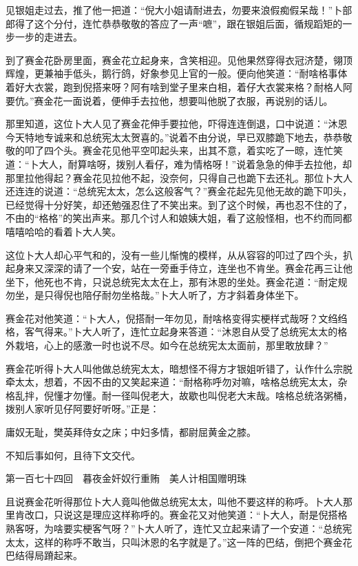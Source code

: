 \documentclass[12pt,UTF8]{ctexbook}
\begin{document}
{{{见银姐走过去，推了他一把道：“倪大小姐请耐进去，勿要来浪假痴假呆哉！”卜部郎得了这个分付，连忙恭恭敬敬的答应了一声“嗻”，跟在银姐后面，循规蹈矩的一步一步的走进去。

到了赛金花卧房里面，赛金花立起身来，含笑相迎。见他果然穿得衣冠济楚，翎顶辉煌，更兼袖手低头，鹅行鸽，好象参见上官的一般。便向他笑道：“耐啥格事体着好大衣裳，跑到倪搭来呀？阿有啥到堂子里来白相，着仔大衣裳来格？耐格人阿要伉。”赛金花一面说着，便伸手去拉他，想要叫他脱了衣服，再说别的话儿。

那里知道，这位卜大人见了赛金花伸手要拉他，吓得连连倒退，口中说道：“沐恩今天特地专诚来和总统宪太太贺喜的。”说着不由分说，早已双膝跪下地去，恭恭敬敬的叩了四个头。赛金花见他平空叩起头来，出其不意，着实吃了一晾，连忙笑道：“卜大人，耐算啥呀，拨别人看仔，难为情格呀！”说着急急的伸手去拉他，却那里拉他得起？赛金花见拉他不起，没奈何，只得自己也跪下去还礼。那位卜大人还连连的说道：“总统宪太太，怎么这般客气？”赛金花起先见他无故的跪下叩头，已经觉得十分好笑，却还勉强忍住了不笑出来。到了这个时候，再也忍不住的了，不由的“格格”的笑出声来。那几个讨人和娘姨大姐，看了这般怪相，也不约而同都嘻嘻哈哈的看着卜大人笑。

这位卜大人却心平气和的，没有一些儿惭愧的模样，从从容容的叩过了四个头，扒起身来又深深的请了一个安，站在一旁垂手侍立，连坐也不肯坐。赛金花再三让他坐下，他死也不肯，只说总统宪太太在上，那有沐恩的坐处。赛金花道：“耐定规勿坐，是只得倪也陪仔耐勿坐格哉。”卜大人听了，方才斜着身体坐下。

赛金花对他笑道：“卜大人，倪搭耐一年勿见，耐啥格变得实梗样式哉呀？文绉绉格，客气得来。”卜大人听了，连忙立起身来答道：“沐恩自从受了总统宪太太的格外栽培，心上的感激一时也说不尽。如今在总统宪太太面前，那里敢放肆？”

赛金花听得卜大人叫他做总统宪太太，暗想怪不得方才银姐听错了，认作什么宗脱牵太太，想着，不因不由的又笑起来道：“耐格称呼勿对嘛，啥格总统宪太太，杂格乱拌，倪懂才勿懂。耐一径叫倪老大，故歇也叫倪老大末哉。啥格总统洛粥桶，拨别人家听见仔阿要好听呀。”正是：

庸奴无耻，樊英拜侍女之床；中妇多情，都尉屈黄金之膝。

不知后事如何，且待下文交代。





第一百七十四回　暮夜金奸奴行重贿　美人计相国赠明珠





且说赛金花听得那位卜大人竟叫他做总统宪太太，叫他不要这样的称呼。卜大人那里肯改口，只说这是理应这样称呼的。赛金花又对他笑道：“卜大人，耐是倪搭格熟客呀，为啥要实梗客气呀？”卜大人听了，连忙又立起来请了一个安道：“总统宪太太，这样的称呼不敢当，只叫沐恩的名字就是了。”这一阵的巴结，倒把个赛金花巴结得局蹐起来。

}}}
\end{document}

